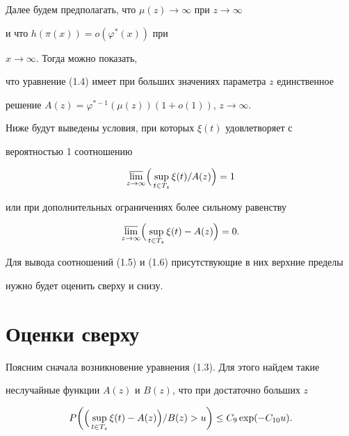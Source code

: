 Далее будем предполагать, что $\mu(z)\to\infty$ при $z\to\infty$ 


и что $h(\pi(x))=o(\varphi^*(x))$ при 


$x\to\infty$. Тогда можно показать, 


что уравнение (1.4) имеет при больших значениях параметра $z$ единственное 


решение $A(z)=\varphi^{*-1}(\mu(z))(1+o(1))$, $z\to\infty$. 


 


Ниже будут выведены условия, при которых $\xi(t)$ удовлетворяет с 


вероятностью 1 соотношению 


\begin{equation} 


\underset{z\to\infty}{\varlimsup}\Bigl(\,\sup_{t\in T_z}\xi(t)/A(z)\Bigr)=1 


\end{equation} 


или при дополнительных ограничениях более сильному равенству 


\begin{equation} 


\underset{z\to\infty}{\varlimsup}\Bigl(\,\sup_{t\in T_z}\xi(t)-A(z)\Bigr)=0. 


\end{equation} 


Для вывода соотношений (1.5) и (1.6) присутствующие в них верхние пределы 


нужно будет оценить сверху и снизу. 


 


\section{Оценки сверху} 


 


Поясним сначала возникновение уравнения (1.3). Для этого найдем такие 


неслучайные функции $A(z)$ и $B(z)$, что при достаточно больших $z$ 


\begin{equation} 


P\biggl(\Bigl(\,\sup_{t\in T_z}\xi(t)-A(z)\Bigr)/B(z)>u\biggr)\le 


C_9\exp(-C_{10}u). 


\end{equation} 


